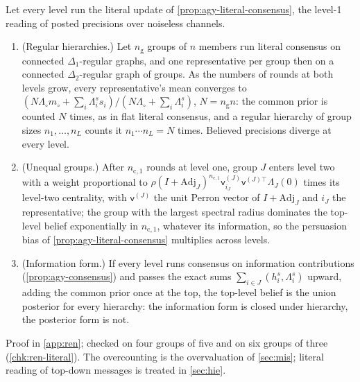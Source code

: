 \begin{proposition}\label{prop:ren-literal-levels}
Let every level run the literal update of \cref{prop:agy-literal-consensus}, the level-1 reading of posted precisions over noiseless channels.
\begin{enumerate}
\item[(a)] (Regular hierarchies.) Let $n_{\mathrm g}$ groups of $n$ members run literal consensus on connected $\Delta_1$-regular graphs, and one representative per group then on a connected $\Delta_2$-regular graph of groups. As the numbers of rounds at both levels grow, every representative's mean converges to $(N\Lambda_\circ m_\circ+\sum_i\Lambda^s_is_i)/(N\Lambda_\circ+\sum_i\Lambda^s_i)$, $N=n_{\mathrm g}n$: the common prior is counted $N$ times, as in flat literal consensus, and a regular hierarchy of group sizes $n_1,\dots,n_L$ counts it $n_1\cdots n_L=N$ times. Believed precisions diverge at every level.
\item[(b)] (Unequal groups.) After $n_{\mathrm c,1}$ rounds at level one, group $J$ enters level two with a weight proportional to $\rho(I+\mathrm{Adj}_J)^{n_{\mathrm c,1}}\mathsf v^{(J)}_{i_J}\mathsf v^{(J)\top}\Lambda_J(0)$ times its level-two centrality, with $\mathsf v^{(J)}$ the unit Perron vector of $I+\mathrm{Adj}_J$ and $i_J$ the representative; the group with the largest spectral radius dominates the top-level belief exponentially in $n_{\mathrm c,1}$, whatever its information, so the persuasion bias of \cref{prop:agy-literal-consensus} multiplies across levels.
\item[(c)] (Information form.) If every level runs consensus on information contributions (\cref{prop:agy-consensus}) and passes the exact sums $\sum_{i\in J}(h^s_i,\Lambda^s_i)$ upward, adding the common prior once at the top, the top-level belief is the union posterior for every hierarchy: the information form is closed under hierarchy, the posterior form is not.
\end{enumerate}
\end{proposition}
Proof in \cref{app:ren}; checked on four groups of five and on six groups of three (\cref{chk:ren-literal}). The overcounting is the overvaluation of \cref{sec:mis}; literal reading of top-down messages is treated in \cref{sec:hie}.

